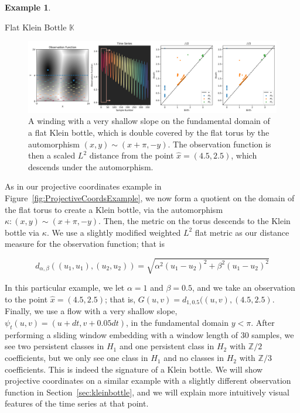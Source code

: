 \documentclass[11pt]{article}
\theoremstyle{definition}
\newtheorem{example}[theorem]{Example}
\theoremstyle{remark}
\newcommand{\KK}{\mathbb{K}}
\begin{document}
    \begin{example}
    \label{ex:distklein}

    Flat Klein Bottle $\KK$

    \begin{figure}[!htb]
        \centering
        \includegraphics[width=\textwidth]{KleinDist.png}
        \caption{A winding with a very shallow slope on the fundamental domain of a flat Klein bottle, which is double covered by the flat torus by the automorphism $(x, y) \sim (x + \pi, -y)$.  The observation function is then a scaled $L^2$ distance from the point $\hat{x} = (4.5, 2.5)$, which descends under the automorphism.}
        \label{fig:KleinDist}
    \end{figure}


    As in our projective coordinates example in Figure~\ref{fig:ProjectiveCoordsExample}, we now form a quotient on the domain of the flat torus to create a Klein bottle, via the automorphism $\kappa: (x, y) \sim (x + \pi, -y)$.  Then, the metric on the torus descends to the Klein bottle via $\kappa$.  We use a slightly modified weighted $L^2$ flat metric as our distance measure for the observation function; that is

    \begin{equation}
    d_{\alpha, \beta}((u_1, u_1), (u_2, u_2)) = \sqrt{ \alpha^2 (u_1 - u_2)^2 + \beta^2 (u_1-u_2)^2}
    \end{equation}

    In this particular example, we let $\alpha = 1$ and $\beta = 0.5$, and we take an observation to the point $\hat{x} = (4.5, 2.5)$; that is, $G(u, v) = d_{1, 0.5}((u, v), (4.5, 2.5)$.  Finally, we use a flow with a very shallow slope, $\psi_t(u, v) = (u + dt, v + 0.05dt)$, in the fundamental domain $y<\pi$. After performing a sliding window embedding with a window length of 30 samples, we see two persistent classes in $H_1$ and one persistent class in $H_2$ with $\mathbb{Z}/2$ coefficients, but we only see one class in $H_1$ and no classes in $H_2$ with $\mathbb{Z}/3$ coefficients.  This is indeed the signature of a Klein bottle.  We will show projective coordinates on a similar example with a slightly different observation function in Section~\ref{sec:kleinbottle}, and we will explain more intuitively visual features of the time series at that point.


\end{example}
\end{document}
